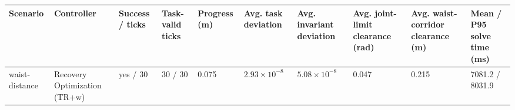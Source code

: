 \begin{tabular}{llllllllll}
\toprule
Scenario & Controller & Success / ticks & Task-valid ticks & Progress (m) & Avg. task deviation & Avg. invariant deviation & Avg. joint-limit clearance (rad) & Avg. waist-corridor clearance (m) & Mean / P95 solve time (ms) \\
\midrule
waist-distance & Recovery Optimization (TR+w) & yes / 30 & 30 / 30 & 0.075 & $2.93\times 10^{-8}$ & $5.08\times 10^{-8}$ & 0.047 & 0.215 & 7081.2 / 8031.9 \\
\bottomrule
\end{tabular}
